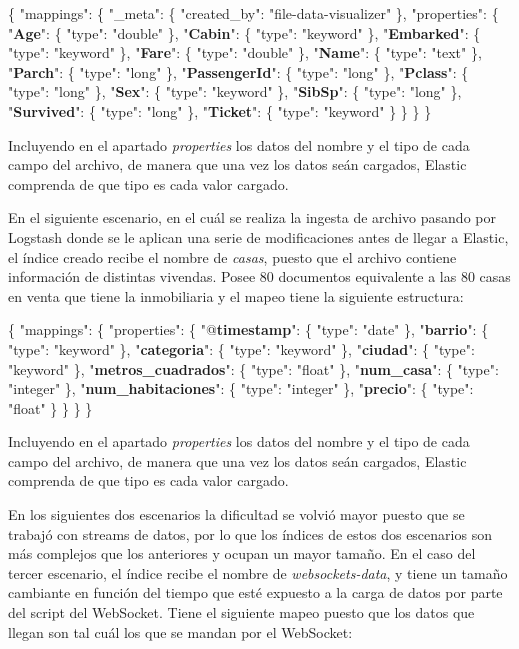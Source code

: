 \{ "mappings": \{ "\_meta": \{ "created\_by": "file-data-visualizer" \}, 
"properties": \{ 
"\textbf{Age}": \{ "type": "double" \}, "\textbf{Cabin}": \{ "type": "keyword" \}, "\textbf{Embarked}": \{ "type": "keyword" \}, "\textbf{Fare}": \{ "type": "double" \}, "\textbf{Name}": \{ "type": "text" \}, "\textbf{Parch}": \{ "type": "long" \}, "\textbf{PassengerId}": \{ "type": "long" \}, "\textbf{Pclass}": \{ "type": "long" \}, "\textbf{Sex}": \{ "type": "keyword" \}, "\textbf{SibSp}": \{ "type": "long" \}, "\textbf{Survived}": \{ "type": "long" \}, "\textbf{Ticket}": \{ "type": "keyword" \} \} \} \} 

Incluyendo en el apartado \textit{properties} los datos del nombre y el tipo de cada campo del archivo, de manera que una vez los datos seán cargados, Elastic comprenda de que tipo es cada valor cargado.

En el siguiente escenario, en el cuál se realiza la ingesta de archivo pasando por Logstash donde se le aplican una serie de modificaciones antes de llegar a Elastic, el índice creado recibe el nombre de \textit{casas}, puesto que el archivo contiene información de distintas vivendas. Posee 80 documentos equivalente a las 80 casas en venta que tiene la inmobiliaria y el mapeo tiene la siguiente estructura:

\{ "mappings": \{ "properties": \{ "@\textbf{timestamp}": \{ "type": "date" \}, "\textbf{barrio}": \{ "type": "keyword" \}, "\textbf{categoria}": \{ "type": "keyword" \}, "\textbf{ciudad}": \{ "type": "keyword" \}, "\textbf{metros\_cuadrados}": \{ "type": "float" \}, "\textbf{num\_casa}": \{ "type": "integer" \}, "\textbf{num\_habitaciones}": \{ "type": "integer" \}, "\textbf{precio}": \{ "type": "float" \} \} \} \}

Incluyendo en el apartado \textit{properties} los datos del nombre y el tipo de cada campo del archivo, de manera que una vez los datos seán cargados, Elastic comprenda de que tipo es cada valor cargado.

En los siguientes dos escenarios la dificultad se volvió mayor puesto que se trabajó con streams de datos, por lo que los índices de estos dos escenarios son más complejos que los anteriores y ocupan un mayor tamaño. En el caso del tercer escenario, el índice recibe el nombre de \textit{websockets-data}, y tiene un tamaño cambiante en función del tiempo que esté expuesto a la carga de datos por parte del script del WebSocket. Tiene el siguiente mapeo puesto que los datos que llegan son tal cuál los que se mandan por el WebSocket:

